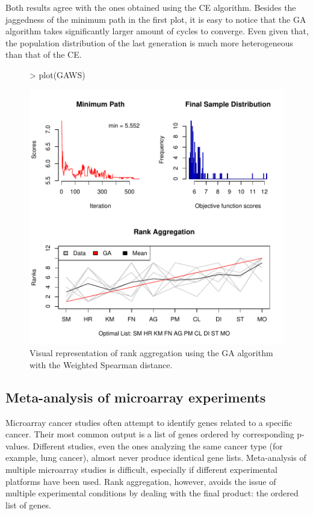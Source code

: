 \documentclass[11pt]{article}
\begin{document}
Both results agree with the ones obtained using the CE algorithm. 
Besides the jaggedness of the minimum path in the first plot, it is easy to notice that the GA 
algorithm takes significantly larger amount of cycles to converge. Even given that, the population distribution 
of the last generation is much more heterogeneous than that of the CE. 

\begin{figure}[hp]
\begin{center}
\begin{Schunk}
\begin{Sinput}
> plot(GAWS)
\end{Sinput}
\end{Schunk}
\includegraphics{RankAggreg-fig2}
\caption{Visual representation of rank aggregation using the GA algorithm with the Weighted Spearman distance.
}
\end{center}
\end{figure}

\subsection{Meta-analysis of microarray experiments}
Microarray cancer studies often attempt to identify genes related to a specific 
cancer. Their most common output is a list of genes ordered by corresponding
p-values. Different studies, even the ones analyzing the same cancer type (for
example, lung cancer), almost never produce identical gene lists. Meta-analysis
of multiple microarray studies is difficult, especially if different experimental
platforms have been used. Rank aggregation, however, avoids the issue of multiple
experimental conditions by dealing with the final product: the ordered list of genes.
\end{document}
